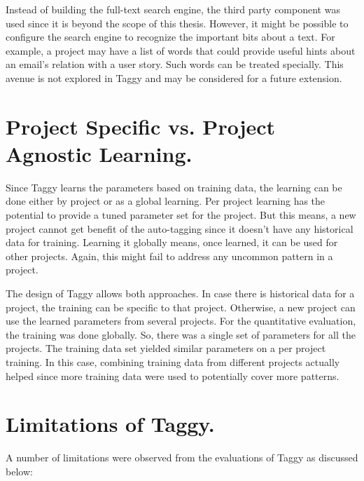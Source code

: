 Instead of building the full-text search engine, the third party component was used since it is beyond the scope of this thesis. However, it might be possible to configure the search engine to recognize the important bits about a text. For example, a project may have a list of words that could provide useful hints about an email's relation with a user story. Such words can be treated specially. This avenue is not explored in Taggy and may be considered for a future extension.

\section {Project Specific vs. Project Agnostic Learning.}
Since Taggy learns the parameters based on training data, the learning can be done either by project or as a global learning. Per project learning has the potential to provide a tuned parameter set for the project. But this means, a new project cannot get benefit of the auto-tagging since it doesn't have any historical data for training. Learning it globally means, once learned, it can be used for other projects. Again, this might fail to address any uncommon pattern in a project.

The design of Taggy allows both approaches. In case there is historical data for a project, the training can be specific to that project. Otherwise, a new project can use the learned parameters from several projects. For the quantitative evaluation, the training was done globally. So, there was a single set of parameters for all the projects. The training data set yielded similar parameters on a per project training. In this case, combining training data from different projects actually helped since more training data were used to potentially cover more patterns.

\section{Limitations of Taggy.}
A number of limitations were observed from the evaluations of Taggy as discussed below:

